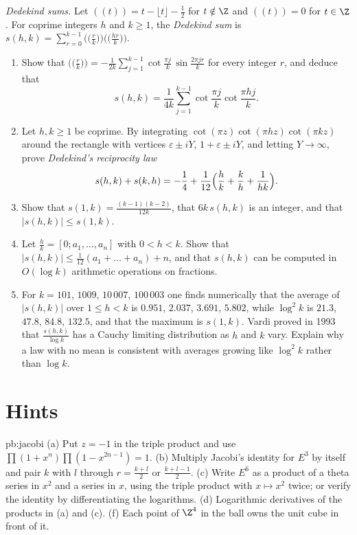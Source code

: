 \begin{exercise}[Journey]\label{pb:dedekind}
\emph{Dedekind sums.} Let $((t))=t-\lfloor t\rfloor-\frac12$ for $t\notin\Z$ and $((t))=0$ for $t\in\Z$. For coprime integers $h$ and $k\ge1$, the \emph{Dedekind sum} is
$s(h,k)=\sum_{r=0}^{k-1}\bigl(\bigl(\frac rk\bigr)\bigr)\bigl(\bigl(\frac{hr}k\bigr)\bigr)$.
\begin{enumerate}[label=(\alph*)]
\item Show that $\bigl(\bigl(\frac rk\bigr)\bigr)=-\frac1{2k}\sum_{j=1}^{k-1}\cot\frac{\pi j}k\,\sin\frac{2\pi jr}k$ for every integer $r$, and deduce that
\[
s(h,k)=\frac1{4k}\sum_{j=1}^{k-1}\cot\frac{\pi j}k\cot\frac{\pi hj}k.
\]
\item Let $h,k\ge1$ be coprime. By integrating $\cot(\pi z)\cot(\pi hz)\cot(\pi kz)$ around the rectangle with vertices $\varepsilon\pm iY$, $1+\varepsilon\pm iY$, and letting
$Y\to\infty$, prove \emph{Dedekind's reciprocity law}
\[
s(h,k)+s(k,h)=-\frac14+\frac1{12}\Bigl(\frac hk+\frac kh+\frac1{hk}\Bigr).
\]
\item Show that $s(1,k)=\frac{(k-1)(k-2)}{12k}$, that $6k\,s(h,k)$ is an integer, and that $|s(h,k)|\le s(1,k)$.
\item Let $\frac hk=[0;a_1,\dots,a_n]$ with $0<h<k$. Show that $|s(h,k)|\le\frac1{12}(a_1+\dots+a_n)+n$, and that $s(h,k)$ can be computed in $O(\log k)$ arithmetic
operations on fractions.
\item For $k=101$, $1009$, $10\,007$, $100\,003$ one finds numerically that the average of $|s(h,k)|$ over $1\le h<k$ is $0.951$, $2.037$, $3.691$, $5.802$, while $\log^2k$ is
$21.3$, $47.8$, $84.8$, $132.5$, and that the maximum is $s(1,k)$. Vardi proved in 1993 that $\frac{s(h,k)}{\log k}$ has a Cauchy limiting distribution as $h$ and $k$
vary. Explain why a law with no mean is consistent with averages growing like $\log^2k$ rather than $\log k$.
\end{enumerate}
\end{exercise}

\section{Hints}

\begin{hint}{pb:jacobi}
(a) Put $z=-1$ in the triple product and use $\prod(1+x^n)\prod(1-x^{2n-1})=1$. (b) Multiply Jacobi's identity for $E^3$ by itself and pair $k$ with $l$ through $r=\frac{k+l}2$
or $\frac{k+l-1}2$. (c) Write $E^6$ as a product of a theta series in $x^2$ and a series in $x$, using the triple product with $x\mapsto x^2$ twice; or verify the identity
by differentiating the logarithms. (d) Logarithmic derivatives of the products in (a) and (c). (f) Each point of $\Z^4$ in the ball owns the unit cube in front of it.
\end{hint}

